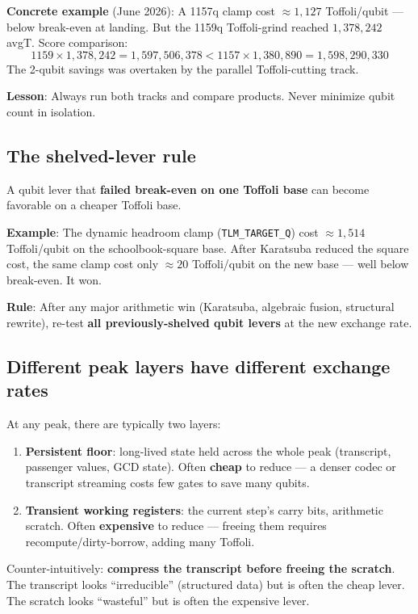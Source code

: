 \documentclass[11pt,a4paper]{article}
\begin{document}
\textbf{Concrete example} (June 2026):
A 1157q clamp cost $\approx1{,}127$ Toffoli/qubit --- below break-even at landing. But the 1159q
Toffoli-grind reached $1{,}378{,}242$ avgT. Score comparison:
\[
  1159 \times 1{,}378{,}242 = 1{,}597{,}506{,}378 < 1157 \times 1{,}380{,}890 = 1{,}598{,}290{,}330
\]
The 2-qubit savings was overtaken by the parallel Toffoli-cutting track.

\textbf{Lesson}: Always run both tracks and compare products. Never minimize qubit count in isolation.

\subsection{The shelved-lever rule}

A qubit lever that \textbf{failed break-even on one Toffoli base} can become favorable on a
cheaper Toffoli base.

\textbf{Example}: The dynamic headroom clamp (\texttt{TLM\_TARGET\_Q}) cost $\approx1{,}514$
Toffoli/qubit on the schoolbook-square base. After Karatsuba reduced the square cost, the same
clamp cost only $\approx20$ Toffoli/qubit on the new base --- well below break-even. It won.

\textbf{Rule}: After any major arithmetic win (Karatsuba, algebraic fusion, structural rewrite),
re-test \textbf{all previously-shelved qubit levers} at the new exchange rate.

\subsection{Different peak layers have different exchange rates}

At any peak, there are typically two layers:

\begin{enumerate}
  \item \textbf{Persistent floor}: long-lived state held across the whole peak (transcript,
    passenger values, GCD state). Often \textbf{cheap} to reduce --- a denser codec or transcript
    streaming costs few gates to save many qubits.
  \item \textbf{Transient working registers}: the current step's carry bits, arithmetic scratch.
    Often \textbf{expensive} to reduce --- freeing them requires recompute/dirty-borrow, adding
    many Toffoli.
\end{enumerate}

Counter-intuitively: \textbf{compress the transcript before freeing the scratch}. The transcript
looks ``irreducible'' (structured data) but is often the cheap lever. The scratch looks
``wasteful'' but is often the expensive lever.
\end{document}
